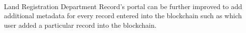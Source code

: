 \documentclass{article}
\begin{document}
            \paragraph{}
            Land Registration Department Record's portal can be further improved to add additional metadata for every record entered into the blockchain such as which user added a particular record into the blockchain.
        

    \clearpage
    
    
\end{document}
